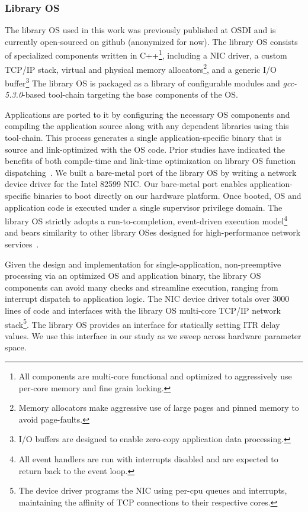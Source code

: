 \subsubsection{Library OS}
\label{sec:OS_libos}
The library OS used in this work was previously published at OSDI and is currently open-sourced on github (anonymized for now). The library OS consists of specialized components written in C++\footnote{ All components are multi-core functional and optimized to aggressively use per-core memory and fine grain locking.}, including a NIC driver, a custom TCP/IP stack, virtual and physical memory allocators\footnote{Memory allocators make aggressive use of large pages and pinned memory to avoid page-faults.}, and a generic I/O buffer\footnote{I/O buffers are designed to enable zero-copy application data processing.} The library OS is packaged as a library of configurable modules and \textit{gcc-5.3.0}-based tool-chain targeting the base components of the OS. 

Applications are ported to it by configuring the necessary OS components and compiling the application source along with any dependent libraries using this tool-chain. This process generates a single application-specific binary that is source and link-optimized with the OS code. Prior studies have indicated the benefits of both compile-time and link-time optimization on library OS function dispatching~\cite{EbbRT}. We built a bare-metal port of the library OS by writing a network device driver for the Intel 82599 NIC. Our bare-metal port enables application-specific binaries to boot directly on our hardware platform. Once booted, OS and application code is executed under a single supervisor privilege domain. The library OS strictly adopts a run-to-completion, event-driven execution model\footnote{All event handlers are run with interrupts disabled and are expected to return back to the event loop.} and bears similarity to other library OSes designed for high-performance network services~\cite{10.1145/2997641, seda, 10.1145/2812806, EbbRT}.


Given the design and implementation for single-application, non-preemptive processing via an optimized OS and application binary, the library OS components can avoid many checks and streamline execution, ranging from interrupt dispatch to application logic. The NIC device driver totals over 3000 lines of code and interfaces with the library OS multi-core TCP/IP network stack\footnote{The device driver programs the NIC using per-cpu queues and interrupts, maintaining the affinity of TCP connections to their respective cores.}. The library OS provides an interface for statically setting ITR delay values. We use this interface in our study as we sweep across hardware parameter space. 

